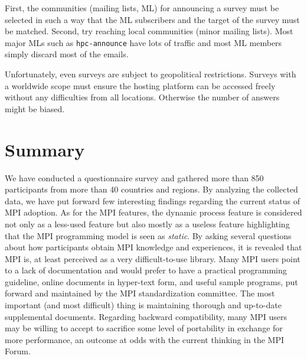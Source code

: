 \documentclass[preprint,5p,times]{elsarticle}
\begin{document}
{{\begin{description}[leftmargin=0cm]
\item[Reaching the Target Community]
First, the communities (mailing lists, ML) for announcing a survey
must be selected
in such a way that the ML subscribers and the target of the survey
must be matched. Second, try reaching local communities (minor mailing
lists). Most major MLs such as {\tt hpc-announce} have lots
of traffic and most ML members simply discard most of the emails.

\item[Online Forms]
Unfortunately, even surveys are subject to geopolitical restrictions.
Surveys with a worldwide scope must ensure the hosting platform
can be accessed freely
without any difficulties from all locations. Otherwise the number of
answers might be biased.

\end{description}
}

\section{Summary}

We have conducted a questionnaire survey and gathered more than 850
participants from more than 40 countries and regions. By analyzing the collected
data, we have put forward few interesting findings regarding the current status
of MPI adoption. As for the MPI features, the dynamic process feature is
considered not only as a less-used feature but also mostly as a useless feature
highlighting that the MPI programming model is seen as {\em static}. By asking
several questions about how participants obtain MPI knowledge and experiences, it is
revealed that MPI is, at least perceived as a very difficult-to-use library.
 Many MPI users point to a lack of
documentation and would prefer to have a practical programming guideline, online
documents in hyper-text form, and useful sample programs, put forward and
maintained by the MPI standardization committee. The most important (and most
difficult) thing is maintaining thorough and up-to-date supplemental documents.
Regarding backward compatibility, many MPI users may be willing to accept to
sacrifice some level of portability in exchange for more performance, an outcome
at odds with the current thinking in the MPI Forum.

}
\end{document}
